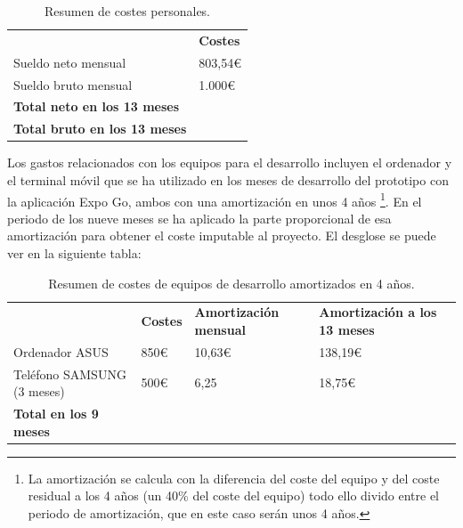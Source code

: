     \begin{table}[h!]
    \centering
    \begin{tabular}{ |m{6cm} m{3cm}|  } 
    \hline
    \cellcolor[HTML]{EFEFEF}\textbf{} & \cellcolor[HTML]{EFEFEF}\textbf{Costes}\\
    
    Sueldo neto mensual           & {803,54\euro} \\
    
    Sueldo bruto mensual                & {1.000\euro}\\
    \hline
    \cellcolor[HTML]{EFEFEF}\textbf{Total neto en los 13 meses}                & \cellcolor[HTML]{EFEFEF}{10.446,02\euro} \\
    
    \cellcolor[HTML]{EFEFEF}\textbf{Total bruto en los 13 meses}                & \cellcolor[HTML]{EFEFEF}{13.000\euro} \\
    \hline
    \end{tabular}
    \caption{Resumen de costes personales.}
    \end{table}

    Los gastos relacionados con los equipos para el desarrollo incluyen el ordenador y el terminal móvil que se ha utilizado en los meses de desarrollo del prototipo con la aplicación Expo Go, ambos con una amortización en unos 4 años \footnote{La amortización se calcula con la diferencia del coste del equipo y del coste residual a los 4 años (un 40\% del coste del equipo) todo ello divido entre el periodo de amortización, que en este caso serán unos 4 años.}. En el periodo de los nueve meses se ha aplicado la parte proporcional de esa amortización para obtener el coste imputable al proyecto. El desglose se puede ver en la siguiente tabla:

    \begin{table}[h!]
    \centering
    \begin{tabular}{ |m{5cm} m{2cm} m{3cm} m{3cm}|  } 
    \hline
    \cellcolor[HTML]{EFEFEF}\textbf{} & \cellcolor[HTML]{EFEFEF}\textbf{Costes} & \cellcolor[HTML]{EFEFEF}\textbf{Amortización mensual}& \cellcolor[HTML]{EFEFEF}\textbf{Amortización a los 13 meses}\\
    
    Ordenador ASUS           & {850\euro }& {10,63\euro } & {138,19\euro }\\

    Teléfono SAMSUNG (3 meses)           & {500\euro } & {6,25} & {18,75\euro }\\
    
    \hline
    \cellcolor[HTML]{EFEFEF}\textbf{Total en los 9 meses}                & \cellcolor[HTML]{EFEFEF}{1350\euro } & \cellcolor[HTML]{EFEFEF}{ } & \cellcolor[HTML]{EFEFEF}{156,94\euro } \\
    \hline
    \end{tabular}
    \caption{Resumen de costes de equipos de desarrollo amortizados en 4 años.}
    \end{table}

